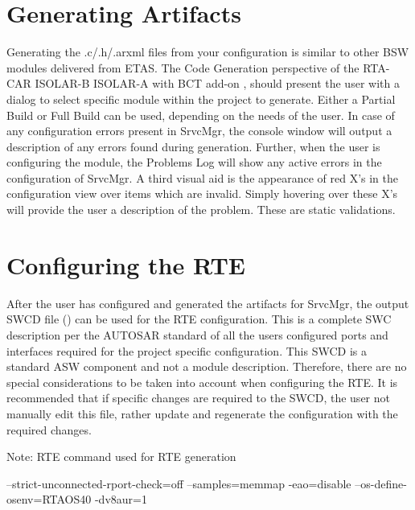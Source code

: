 \section{Generating Artifacts}
\label{sec:artifacts}
Generating the .c/.h/.arxml files from your configuration is similar to other BSW modules delivered from ETAS.
The Code Generation perspective of the 
\ifnum {}
{
RTA-CAR ISOLAR-B
}
\else
{
ISOLAR-A with BCT add-on 
}\fi , should present the user with a dialog to select specific module within the project to generate.
\ifnum {}
{
}
\else
{
Either a Partial Build or Full Build can be used, depending on the needs of the user.
}\fi
In case of any configuration errors present in SrvcMgr, the console window will output a description of any errors found during generation.
Further, when the user is configuring the module, the Problems Log will show any active errors in the configuration of SrvcMgr.
A third visual aid is the appearance of red X’s in the configuration view over items which are invalid.
Simply hovering over these X’s will provide the user a description of the problem.
These are static validations.

\section{Configuring the RTE}
After the user has configured and generated the artifacts for SrvcMgr, the output SWCD file \linebreak() can be used for the RTE configuration.
This is a complete SWC description per the AUTOSAR standard of all the users configured ports and interfaces required for the project specific configuration.
This SWCD is a standard ASW component and not a module description.
Therefore, there are no special considerations to be taken into account when configuring the RTE.
It is recommended that if specific changes are required to the SWCD, the user not manually edit this file, rather update and regenerate the configuration with the required changes.

Note: RTE command used for RTE generation

\begin{rtecommandline}
--strict-unconnected-rport-check=off --samples=memmap -eao=disable --os-define-osenv=RTAOS40 -dv8aur=1
\end{rtecommandline}